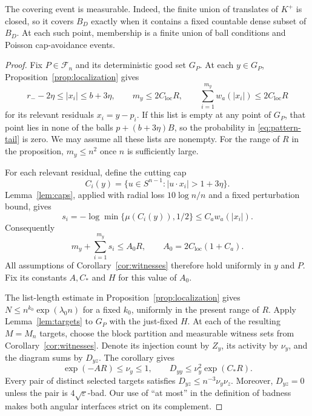 The covering event is measurable. Indeed, the finite union of translates
of $K^+$ is closed, so it covers $B_D$ exactly when it contains a fixed
countable dense subset of $B_D$. At each such point, membership is a
finite union of ball conditions and Poisson cap-avoidance events.

\begin{proof}
Fix $P\in\mathcal F_n$ and its deterministic good set $G_P$.
At each $y\in G_P$, Proposition~\ref{prop:localization} gives
\begin{equation}
 r_--2\eta\le |x_i|\le b+3\eta,\qquad
 m_y\le2C_{\mathrm{loc}}R,\qquad
 \sum_{i=1}^{m_y}w_a(|x_i|)\le2C_{\mathrm{loc}}R
\label{eq:target-residual-budget}
\end{equation}
for its relevant residuals $x_i=y-p_i$.
If this list is empty at any point of $G_P$, that point lies in none of
the balls $p+(b+3\eta)B$, so the probability in
\eqref{eq:pattern-tail} is zero.  We may assume all these lists are
nonempty.  For the range of $R$ in the proposition,
$m_y\le n^2$ once $n$ is sufficiently large.

For each relevant residual, define the cutting cap
\[
 C_i(y)=\{u\in S^{n-1}:|u\cdot x_i|>1+3\eta\}.
\]
Lemma~\ref{lem:caps}, applied with radial loss $10\log n/n$
and a fixed perturbation bound, gives
\[
 s_i=-\log\min\{\mu(C_i(y)),1/2\}
       \le C_a w_a(|x_i|).
\]
Consequently
\begin{equation}
 m_y+\sum_{i=1}^{m_y}s_i\le A_0R,
 \qquad A_0=2C_{\mathrm{loc}}(1+C_a).
\label{eq:target-cap-budget}
\end{equation}
All assumptions of Corollary~\ref{cor:witnesses}
therefore hold uniformly in $y$ and $P$.  Fix its constants $A,C_*$ and
$H$ for this value of $A_0$.

The list-length estimate in Proposition~\ref{prop:localization} gives
$N\le n^{k_0}\exp(\lambda_0n)$ for a fixed $k_0$, uniformly in the
present range of $R$.  Apply Lemma~\ref{lem:targets} to $G_P$ with the
just-fixed $H$.  At each of the resulting $M=M_n$ targets, choose the
block partition and measurable witness sets from
Corollary~\ref{cor:witnesses}.  Denote its injection count by $Z_y$,
its activity by $\nu_y$, and the diagram sums by $D_{yz}$.
The corollary gives
\begin{equation}
 \exp(-AR)\le\nu_y\le1,
 \qquad D_{yy}\le\nu_y^2\exp(C_*R).
\label{eq:target-activities}
\end{equation}
Every pair of distinct selected targets satisfies
$D_{yz}\le n^{-3}\nu_y\nu_z$.
Moreover, $D_{yz}=0$ unless the pair is $4\sqrt\varepsilon$-bad.
Our use of ``at most'' in the definition of badness makes both angular
interfaces strict on its complement.


\end{proof}
